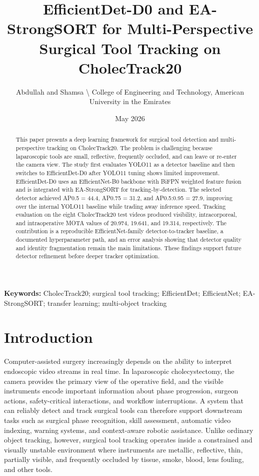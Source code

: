 \documentclass[12pt,a4paper]{article}
\title{EfficientDet-D0 and EA-StrongSORT for Multi-Perspective Surgical Tool Tracking on CholecTrack20}
\author{Abdullah and Shamsa \textbackslash{} College of Engineering and Technology, American University in the Emirates}
\date{May 2026}
\begin{document}
\maketitle

\begin{abstract}

This paper presents a deep learning framework for surgical tool detection and multi-perspective tracking on CholecTrack20. The problem is challenging because laparoscopic tools are small, reflective, frequently occluded, and can leave or re-enter the camera view. The study first evaluates YOLO11 as a detector baseline and then switches to EfficientDet-D0 after YOLO11 tuning shows limited improvement. EfficientDet-D0 uses an EfficientNet-B0 backbone with BiFPN weighted feature fusion and is integrated with EA-StrongSORT for tracking-by-detection. The selected detector achieved AP0.5 = 44.4, AP0.75 = 31.2, and AP0.5:0.95 = 27.9, improving over the internal YOLO11 baseline while trading away inference speed. Tracking evaluation on the eight CholecTrack20 test videos produced visibility, intracorporeal, and intraoperative MOTA values of 20.974, 19.641, and 19.314, respectively. The contribution is a reproducible EfficientNet-family detector-to-tracker baseline, a documented hyperparameter path, and an error analysis showing that detector quality and identity fragmentation remain the main limitations. These findings support future detector refinement before deeper tracker optimization.

\end{abstract}

\textbf{Keywords:} CholecTrack20; surgical tool tracking; EfficientDet; EfficientNet; EA-StrongSORT; transfer learning; multi-object tracking

\section{Introduction}

Computer-assisted surgery increasingly depends on the ability to interpret endoscopic video streams in real time. In laparoscopic cholecystectomy, the camera provides the primary view of the operative field, and the visible instruments encode important information about phase progression, surgeon actions, safety-critical interactions, and workflow interruptions. A system that can reliably detect and track surgical tools can therefore support downstream tasks such as surgical phase recognition, skill assessment, automatic video indexing, warning systems, and context-aware robotic assistance. Unlike ordinary object tracking, however, surgical tool tracking operates inside a constrained and visually unstable environment where instruments are metallic, reflective, thin, partially visible, and frequently occluded by tissue, smoke, blood, lens fouling, and other tools.
\end{document}
